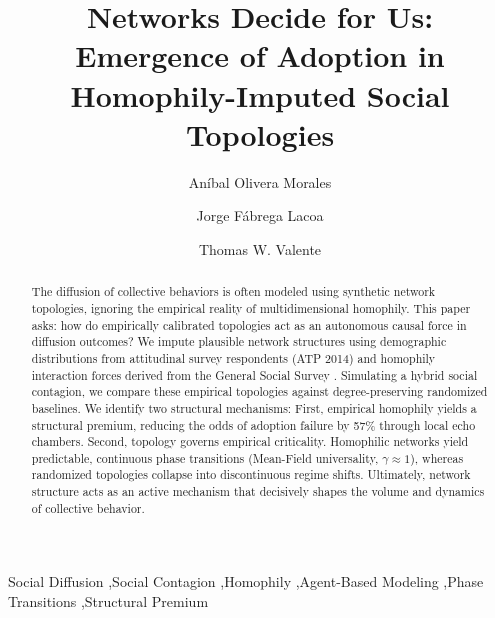 \documentclass[5p,twocolumn,authoryear]{elsarticle}
\begin{document}
\begin{frontmatter}

\title{Networks Decide for Us: Emergence of Adoption in Homophily-Imputed Social Topologies}

\author[1]{Aníbal Olivera Morales}
\author[1]{Jorge Fábrega Lacoa}
\author[2]{Thomas W. Valente}

\address[1]{Centro de Investigación en Complejidad Social (CICS), Universidad del Desarrollo, Santiago, Chile}
\address[2]{Department of Population and Public Health Sciences, Keck School of Medicine, University of Southern California, Los Angeles, USA}


\begin{abstract}
The diffusion of collective behaviors is often modeled using synthetic network topologies, ignoring the empirical reality of multidimensional homophily. This paper asks: how do empirically calibrated topologies act as an autonomous causal force in diffusion outcomes? We impute plausible network structures using demographic distributions from attitudinal survey respondents (ATP 2014) and homophily interaction forces derived from the General Social Survey \citep{smith2014}. Simulating a hybrid social contagion, we compare these empirical topologies against degree-preserving randomized baselines. We identify two structural mechanisms: First, empirical homophily yields a structural premium, reducing the odds of adoption failure by 57\% through local echo chambers. Second, topology governs empirical criticality. Homophilic networks yield predictable, continuous phase transitions (Mean-Field universality, $\gamma \approx 1$), whereas randomized topologies collapse into discontinuous regime shifts. Ultimately, network structure acts as an active mechanism that decisively shapes the volume and dynamics of collective behavior.
\end{abstract}

\begin{keyword}
Social Diffusion \sep Social Contagion \sep Homophily \sep Agent-Based Modeling \sep Phase Transitions \sep Structural Premium
\end{keyword}

\end{frontmatter}
\end{document}
